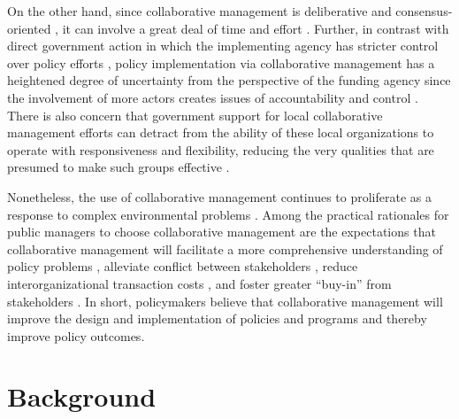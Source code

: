 \documentclass[11pt,a4paper,titlepage]{article}
\begin{document}
On the other hand, since collaborative management is deliberative and consensus-oriented \parencite{ansell2008}, it can involve a great deal of time and effort \parencite{margerum2011}. Further, in contrast with direct government action in which the implementing agency has stricter control over policy efforts \parencite{salamon2002}, policy implementation via collaborative management has a heightened degree of uncertainty from the perspective of the funding agency since the involvement of more actors creates issues of accountability and control \parencite{weber2003}. There is also concern that government support for local collaborative management efforts can detract from the ability of these local organizations to operate with responsiveness and flexibility, reducing the very qualities that are presumed to make such groups effective \parencite{smith2004,nikolic2008}.

Nonetheless, the use of collaborative management continues to proliferate \parencite{ansell2008,emerson2012} as a response to complex environmental problems \parencite{margerum2011}. Among the practical rationales for public managers to choose collaborative management are the expectations that collaborative management will facilitate a more comprehensive understanding of policy problems \parencite{leach2013}, alleviate conflict between stakeholders \parencite{berardo2014}, reduce interorganizational transaction costs \parencite{emerson2012,scott2014}, and foster greater “buy-in” from stakeholders \parencite{ansell2008}. In short, policymakers believe that collaborative management will improve the design and implementation of policies and programs and thereby improve policy outcomes.

\section*{Background}
\end{document}
